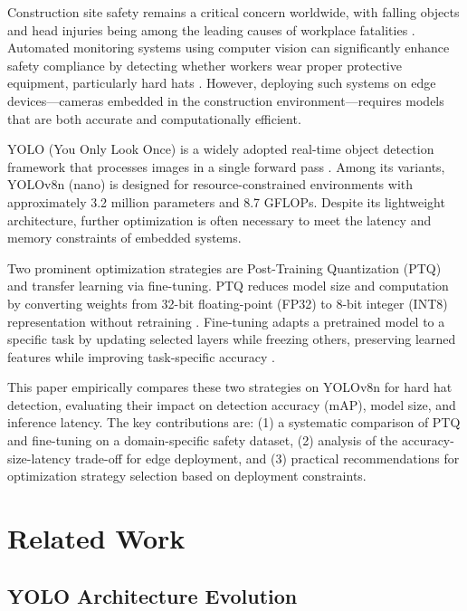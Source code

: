 \documentclass[conference,a4paper]{IEEEtran}
\begin{document}
Construction site safety remains a critical concern worldwide, with falling objects and head injuries being among the leading causes of workplace fatalities \cite{bureau2023fatal}. Automated monitoring systems using computer vision can significantly enhance safety compliance by detecting whether workers wear proper protective equipment, particularly hard hats \cite{nasirzadeh2023deep}. However, deploying such systems on edge devices---cameras embedded in the construction environment---requires models that are both accurate and computationally efficient.

YOLO (You Only Look Once) is a widely adopted real-time object detection framework that processes images in a single forward pass \cite{jocher2023ultralytics}. Among its variants, YOLOv8n (nano) is designed for resource-constrained environments with approximately 3.2 million parameters and 8.7 GFLOPs. Despite its lightweight architecture, further optimization is often necessary to meet the latency and memory constraints of embedded systems.

Two prominent optimization strategies are Post-Training Quantization (PTQ) and transfer learning via fine-tuning. PTQ reduces model size and computation by converting weights from 32-bit floating-point (FP32) to 8-bit integer (INT8) representation without retraining \cite{jacob2018quantization}. Fine-tuning adapts a pretrained model to a specific task by updating selected layers while freezing others, preserving learned features while improving task-specific accuracy \cite{tan2019efficientnet}.

This paper empirically compares these two strategies on YOLOv8n for hard hat detection, evaluating their impact on detection accuracy (mAP), model size, and inference latency. The key contributions are: (1) a systematic comparison of PTQ and fine-tuning on a domain-specific safety dataset, (2) analysis of the accuracy-size-latency trade-off for edge deployment, and (3) practical recommendations for optimization strategy selection based on deployment constraints.

\section{Related Work}

\subsection{YOLO Architecture Evolution}
\end{document}
